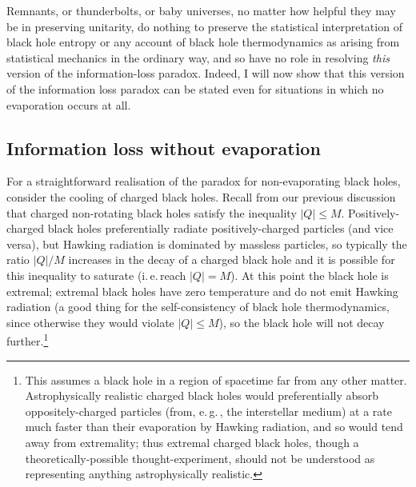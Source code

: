 \documentclass[12pt]{article}
\newcommand{\iec}{\mbox{i.\,e.\,}}
\newcommand{\egc}{\mbox{e.\,g.\,}}
\begin{document}
Remnants, or thunderbolts,  or baby universes, no matter how helpful they may be in preserving unitarity, do nothing to preserve the statistical interpretation of black hole entropy or any account of black hole thermodynamics as arising from statistical mechanics in the ordinary way, and so have no role in resolving \emph{this} version of the information-loss paradox. Indeed, I will now show that this version of the information loss paradox can be stated even for situations in which no evaporation occurs at all.

\subsection{Information loss without evaporation}\label{infoparadox-noevap}

For a straightforward realisation of the paradox for non-evaporating black holes, consider the cooling of charged black holes. Recall from our previous discussion that charged non-rotating black holes satisfy the inequality $|Q|\leq M$. Positively-charged black holes preferentially radiate positively-charged particles (and vice versa), but Hawking radiation is dominated by massless particles, so typically the ratio $|Q|/M$ increases in the decay of a charged black hole and it is possible for this inequality to saturate (\iec reach $|Q|=M$). At this point the black hole is extremal; extremal black holes have zero temperature and do not emit Hawking radiation (a good thing for the self-consistency of black hole thermodynamics, since otherwise they would violate $|Q|\leq M$), so the black hole will not decay further.\footnote{This assumes a black hole in a region of spacetime far from any other matter. Astrophysically realistic charged black holes would preferentially absorb oppositely-charged particles (from, \egc, the interstellar medium) at a rate much faster than their evaporation by Hawking radiation, and so would tend away from extremality; thus extremal charged black holes, though a theoretically-possible thought-experiment, should not be understood as representing anything astrophysically realistic.}
\end{document}

